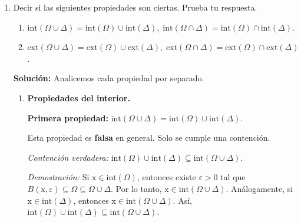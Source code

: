 \documentclass[12pt]{article}
\newcommand{\Ext}{\mathrm{ext}}
\newcommand{\Int}{\mathrm{int}}
\newcommand{\R}{\mathbb R}
\newcommand{\x}{\mathrm x}
\begin{document}
\begin{enumerate}
Para encontrar la cerradura, observamos que si tomamos puntos $(x,y)$ que cumplen $x^2 - y^2 > 1$ y los acercamos a la curva $x^2 - y^2 = 1$, podemos aproximarnos tanto como queramos. Por lo tanto, la cerradura de $\Omega$ es el conjunto donde $x^2 - y^2 \geq 1$. Es decir,
\[
\overline{\Omega} = \{ (x,y)\in \R^2 : x^2 - y^2 \geq 1 \}.
\]
Esto se debe a que la adherencia de un conjunto abierto definido por una desigualdad estricta con una función continua es el conjunto definido por la desigualdad no estricta correspondiente.

Ahora, determinamos la frontera. Usando la definición de frontera como $\partial \Omega = \overline{\Omega} \setminus \Int(\Omega)$, tenemos:
\[
\partial \Omega = \{ (x,y)\in \R^2 : x^2 - y^2 \geq 1 \} \setminus \{ (x,y)\in \R^2 : x^2 - y^2 > 1 \}.
\]
La diferencia entre estos dos conjuntos es precisamente el conjunto de puntos donde se cumple la igualdad. Por lo tanto,
\[
\partial \Omega = \{ (x,y)\in \R^2 : x^2 - y^2 = 1 \}.
\]

\item Decir si las siguientes propiedades son ciertas. Prueba tu respuesta.
\begin{enumerate}[(1)]
\item $\Int(\Omega\cup \Delta) = \Int(\Omega)\cup \Int(\Delta),\; \Int(\Omega\cap \Delta) = \Int(\Omega)\cap \Int(\Delta)$.
\item $\Ext(\Omega\cup \Delta) = \Ext(\Omega)\cup \Ext(\Delta),\; \Ext(\Omega\cap \Delta) = \Ext(\Omega)\cap \Ext(\Delta)$.
\end{enumerate}

\textbf{Solución: } Analicemos cada propiedad por separado.

\begin{enumerate}[(1)]
\item \textbf{Propiedades del interior.}

\textbf{Primera propiedad:} $\Int(\Omega\cup \Delta) = \Int(\Omega)\cup \Int(\Delta)$.

Esta propiedad es \textbf{falsa} en general. Solo se cumple una contención.

\textit{Contención verdadera:} $\Int(\Omega)\cup \Int(\Delta) \subseteq \Int(\Omega\cup \Delta)$.

\textit{Demostración:} Si $\x \in \Int(\Omega)$, entonces existe $\varepsilon > 0$ tal que $B(\x, \varepsilon) \subseteq \Omega \subseteq \Omega \cup \Delta$. Por lo tanto, $\x \in \Int(\Omega \cup \Delta)$. Análogamente, si $\x \in \Int(\Delta)$, entonces $\x \in \Int(\Omega \cup \Delta)$. Así, $\Int(\Omega)\cup \Int(\Delta) \subseteq \Int(\Omega\cup \Delta)$.


\end{enumerate}
\end{enumerate}
\end{document}
